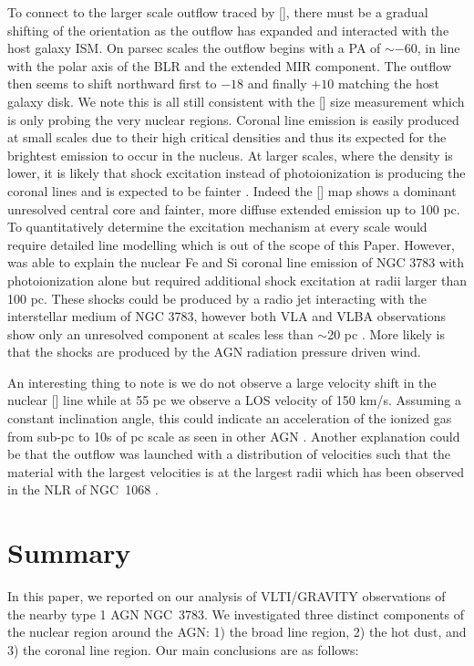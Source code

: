 \documentclass[longauth,]{aa}
\newcommand{\caviii}{[\ion{Ca}{viii}]}
\newcommand{\sivi}{[\ion{Si}{vi}]}
\begin{document}
To connect to the larger scale outflow traced by \sivi{}, there must be a gradual shifting of the orientation as the outflow has expanded and interacted with the host galaxy ISM. On parsec scales the outflow begins with a PA of $\sim-60$\degree{}, in line with the polar axis of the BLR and the extended MIR component. The outflow then seems to shift northward first to $-18$\degree{} and finally $+10$\degree{} matching the host galaxy disk. We note this is all still consistent with the \caviii{} size measurement which is only probing the very nuclear regions. Coronal line emission is easily produced at small scales due to their high critical densities and thus its expected for the brightest emission to occur in the nucleus. At larger scales, where the density is lower, it is likely that shock excitation instead of photoionization is producing the coronal lines and is expected to be fainter \citep{Rodriguez-Ardila:2017ab,May:2018aa}. Indeed the \sivi{} map shows a dominant unresolved central core and fainter, more diffuse extended emission up to 100 pc. To quantitatively determine the excitation mechanism at every scale would require detailed line modelling which is out of the scope of this Paper. However, \citet{Rodriguez-Ardila:2006aa} was able to explain the nuclear Fe and Si coronal line emission of NGC 3783 with photoionization alone but required additional shock excitation at radii larger than 100 pc. These shocks could be produced by a radio jet interacting with the interstellar medium of NGC 3783, however both VLA and VLBA observations show only an unresolved component at scales less than $\sim$20 pc \citep{Schmitt:2001aa,Orienti:2010aa}. More likely is that the shocks are produced by the AGN radiation pressure driven wind.

An interesting thing to note is we do not observe a large velocity shift in the nuclear \caviii{} line while at 55 pc we observe a LOS velocity of 150 km/s. Assuming a constant inclination angle, this could indicate an acceleration of the ionized gas from sub-pc to 10s of pc scale as seen in other AGN \citep[e.g][]{Muller-Sanchez:2011aa}. Another explanation could be that the outflow was launched with a distribution of velocities such that the material with the largest velocities is at the largest radii which has been observed in the NLR of NGC~1068 \citep{Miyauchi:2020aa}. 

\section{Summary}
In this paper, we reported on our analysis of VLTI/GRAVITY observations of the nearby type 1 AGN NGC~3783. We investigated three distinct components of the nuclear region around the AGN: 1) the broad line region, 2) the hot dust, and 3) the coronal line region. Our main conclusions are as follows:
\end{document}
